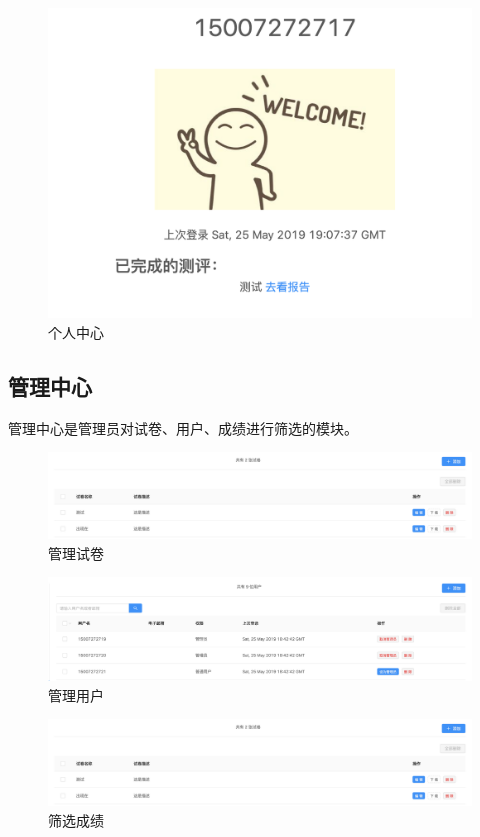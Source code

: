 \begin{figure}[thbp!]
	\centering
	\includegraphics[width=0.6\linewidth]{figure/main}
	\caption{个人中心}
	\label{fig:main}
\end{figure}

\subsection{管理中心}

管理中心是管理员对试卷、用户、成绩进行筛选的模块。

\begin{figure}[thbp!]
	\centering
	\includegraphics[width=1.0\linewidth]{figure/admin_paper}
	\caption{管理试卷}
	\label{fig:admin_paper}
\end{figure}

\begin{figure}[thbp!]
	\centering
	\includegraphics[width=1.0\linewidth]{figure/admin_user}
	\caption{管理用户}
	\label{fig:admin_user}
\end{figure}

\begin{figure}[thbp!]
	\centering
	\includegraphics[width=1.0\linewidth]{figure/admin_paper}
	\caption{筛选成绩}
	\label{fig:admin_paper}
\end{figure}

